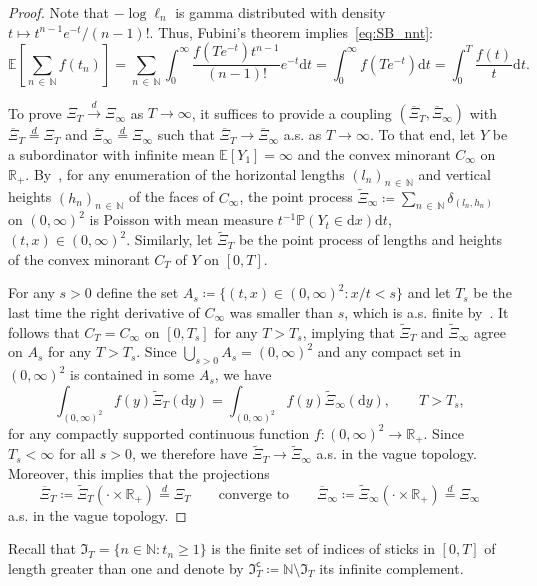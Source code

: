 \documentclass[AHL,Unicode,longabstracts,published]{cedram}
\newcommand\N{\mathbb{N}}
\newcommand\R{\mathbb{R}}
\newcommand\E{\mathds{E}}
\newcommand\p{\mathds{P}}
\newcommand\1{\mathds{1}}
\newcommand\D{\mathrm{d}}
\newcommand\GI{\mathfrak{I}}
\newcommand\co{\mathsf{c}}
\newcommand\eqd{\overset{d}{=}}
\newcommand\cid{\xrightarrow{d}}
\newcommand\ov[1]{\overline{#1}}
\newcommand\wt{\widetilde}
\begin{document}
\begin{proof}
Note that $-\log\ell_n$ is gamma distributed with density $t\mapsto t^{n-1}e^{-t}/(n-1)!$. Thus, Fubini's theorem implies~\eqref{eq:SB_nnt}:
\[
\E\left[\sum_{n\,\in\,\N}f(t_n)\right] =\sum_{n\,\in\,\N} \int_0^\infty
\frac{f\left(Te^{-t}\right)t^{n-1}}{(n-1)!}e^{-t}\D t =\int_0^\infty f\left(Te^{-t}\right)\D t =\int_0^T \frac{f(t)}{t}\D t.
\]

To prove $\Xi_T\cid\Xi_\infty$ as $T\to\infty$, it suffices to provide a coupling $(\ov\Xi_T,\ov\Xi_\infty)$ with $\ov\Xi_T\eqd\Xi_T$ and $\ov\Xi_\infty\eqd\Xi_\infty$ such that $\ov\Xi_T\to\ov\Xi_\infty$ a.s. as $T\to\infty$. To that end, let $Y$ be a subordinator with infinite mean $\E[Y_1]=\infty$ and the convex minorant $C_\infty$ on $\R_+$. By~\cite[Cor.~3]{MR2978134}, for any enumeration of the horizontal lengths $(l_n)_{n\,\in\,\N}$ and vertical heights $(h_n)_{n\,\in\,\N}$ of the faces of $C_\infty$, the point process $\wt\Xi_\infty\coloneqq\sum_{n\,\in\,\N}\delta_{(l_n,h_n)}$ on $(0,\infty)^2$ is Poisson with mean measure $t^{-1}\p(Y_t\in \D x)\D t$, $(t,x)\in(0,\infty)^2$. Similarly, let $\wt\Xi_T$ be the point process of lengths and heights of the convex minorant $C_T$ of $Y$ on $[0,T]$.

For any $s>0$ define the set $A_s\coloneqq \{(t,x)\in(0,\infty)^2: x/t<s\}$ and let $T_s$ be the last time the right derivative of $C_\infty$ was smaller than $s$, which is a.s. finite by~\cite[Corollary~3]{MR2978134}. It follows that $C_T=C_\infty$ on $[0,T_s]$ for any $T>T_s$, implying that $\wt\Xi_T$ and $\wt\Xi_\infty$ agree on $A_s$ for any $T>T_s$. Since $\bigcup_{s>0}A_s=(0,\infty)^2$ and any compact set in $(0,\infty)^2$ is contained in some $A_s$, we have
\[
\int_{(0,\infty)^2}f(y)\wt\Xi_T(\D y) =\int_{(0,\infty)^2}f(y)\wt\Xi_\infty(\D y),
\qquad T>T_s,
\]
for any compactly supported continuous function $f:(0,\infty)^2\to\R_+$. Since $T_s<\infty$ for all $s>0$, we therefore have $\wt\Xi_T\to\wt\Xi_\infty$ a.s. in the vague topology. Moreover, this implies that the projections
\[
\ov\Xi_T\coloneqq\wt\Xi_T\left(\cdot\times\R_+\right)\eqd\Xi_T\qquad\text{converge to}\qquad\ov\Xi_\infty\coloneqq\wt\Xi_\infty\left(\cdot\times\R_+\right)\eqd\Xi_\infty
\]
a.s. in the vague topology.
\end{proof}


Recall that $\GI_T=\{n\in\N:t_n\ge 1\}$ is the finite set of indices of sticks in $[0,T]$ of length greater than one and denote by $\GI_T^\co\coloneqq\N\setminus\GI_T$ its infinite complement.
\end{document}
